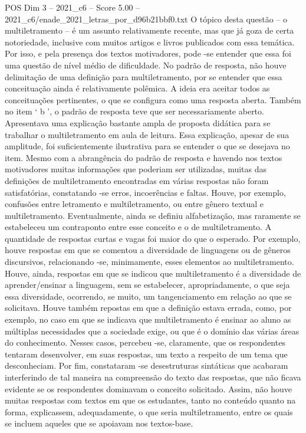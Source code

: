 \begin{textsample}{POS Dim 3 – 2021\_c6 – Score 5.00 – 2021\_c6/enade\_2021\_letras\_por\_d96b21bbf0.txt}
O tópico desta questão – o multiletramento – é um assunto relativamente recente, mas que já goza de certa notoriedade, inclusive com muitos artigos e livros publicados com essa temática.
Por isso, e pela presença dos textos motivadores, pode -se entender que essa foi uma questão de nível médio de dificuldade.
No padrão de resposta, não houve delimitação de uma definição para multiletramento, por se entender que essa conceituação ainda é relativamente polêmica.
A ideia era aceitar todos as conceituações pertinentes, o que se configura como uma resposta aberta.
Também no item ‘ b ’, o padrão de resposta teve que ser necessariamente aberto.
Apresentava uma explicação bastante ampla de proposta didática para se trabalhar o multiletramento em aula de leitura.
Essa explicação, apesar de sua amplitude, foi suficientemente ilustrativa para se entender o que se desejava no item.
Mesmo com a abrangência do padrão de resposta e havendo nos textos motivadores muitas informações que poderiam ser utilizadas, muitas das definições de multiletramento encontradas em várias respostas não foram satisfatórias, constatando -se erros, incoerências e faltas.
Houve, por exemplo, confusões entre letramento e multiletramento, ou entre gênero textual e multiletramento.
Eventualmente, ainda se definiu alfabetização, mas raramente se estabeleceu um contraponto entre esse conceito e o de multiletramento.
A quantidade de respostas curtas e vagas foi maior do que o esperado.
Por exemplo, houve respostas em que se comentou a diversidade de linguagens ou de gêneros discursivos, relacionando -se, minimamente, esses elementos ao multiletramento.
Houve, ainda, respostas em que se indicou que multiletramento é a diversidade de aprender/ensinar a linguagem, sem se estabelecer, apropriadamente, o que seja essa diversidade, ocorrendo, se muito, um tangenciamento em relação ao que se solicitava.
Houve também repostas em que a definição estava errada, como, por exemplo, no caso em que se indicava que multiletramento é ensinar ao aluno as múltiplas necessidades que a sociedade exige, ou que é o domínio das várias áreas do conhecimento.
Nesses casos, percebeu -se, claramente, que os respondentes tentaram desenvolver, em suas respostas, um texto a respeito de um tema que desconheciam.
Por fim, constataram -se desestruturas sintáticas que acabaram interferindo de tal maneira na compreensão do texto das respostas, que não ficava evidente se os respondentes dominavam o conceito solicitado.
Assim, não houve muitas respostas com textos em que os estudantes, tanto no conteúdo quanto na forma, explicassem, adequadamente, o que seria multiletramento, entre os quais se incluem aqueles que se apoiavam nos textos-base.

\end{textsample}
